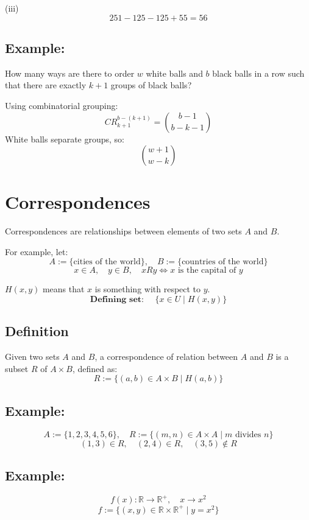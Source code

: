 \documentclass[11pt]{article}
\begin{document}
(iii)
\[
251 - 125 - 125 + 55 = 56
\]

\subsection*{Example:}
How many ways are there to order \( w \) white balls and \( b \) black balls in a row such that there are exactly \( k+1 \) groups of black balls?

Using combinatorial grouping:
\[ CR_{k+1}^{b-(k+1)} = \binom{b-1}{b-k-1} \]
White balls separate groups, so:
\[ \binom{w+1}{w-k} \]

\section{Correspondences}
Correspondences are relationships between elements of two sets $A$ and $B$.

For example, let:
\[
A := \{\text{cities of the world}\}, \quad B := \{\text{countries of the world}\}
\]
\[
x \in A, \quad y \in B, \quad xRy \Longleftrightarrow x \text{ is the capital of } y
\]

$H(x,y)$ means that $x$ is something with respect to $y$.
\[
\textbf{Defining set: } \quad \{x \in U \mid H(x,y)\}
\]

\subsection{Definition}
Given two sets $A$ and $B$, a correspondence of relation between $A$ and $B$ is a subset $R$ of $A \times B$, defined as:
\[
R := \{(a,b) \in A \times B \mid H(a,b)\}
\]

\subsection*{Example:}
\[
A := \{1, 2, 3, 4, 5, 6\}, \quad R := \{(m,n) \in A \times A \mid m \text{ divides } n\}
\]
\[
(1,3) \in R, \quad (2,4) \in R, \quad (3,5) \notin R
\]

\subsection*{Example:}
\[
f(x) : \mathbb{R} \rightarrow \mathbb{R}^+, \quad x \rightarrow x^2
\]
\[
f := \{(x,y) \in \mathbb{R} \times \mathbb{R}^+ \mid y = x^2\}
\]
\end{document}
